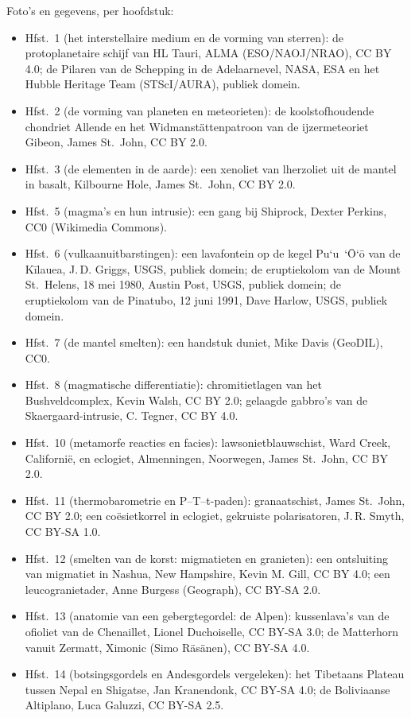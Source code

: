 \bigskip
\noindent Foto's en gegevens, per hoofdstuk:
\begin{itemize}\small
  \item Hfst.~1 (het interstellaire medium en de vorming van sterren): de protoplanetaire schijf van HL Tauri, ALMA (ESO/NAOJ/NRAO), CC BY 4.0; de Pilaren van de Schepping in de Adelaarnevel, NASA, ESA en het Hubble Heritage Team (STScI/AURA), publiek domein.
  \item Hfst.~2 (de vorming van planeten en meteorieten): de koolstofhoudende chondriet Allende en het Widmanstättenpatroon van de ijzermeteoriet Gibeon, James St.~John, CC BY 2.0.
  \item Hfst.~3 (de elementen in de aarde): een xenoliet van lherzoliet uit de mantel in basalt, Kilbourne Hole, James St.~John, CC BY 2.0.
  \item Hfst.~5 (magma's en hun intrusie): een gang bij Shiprock, Dexter Perkins, CC0 (Wikimedia Commons).
  \item Hfst.~6 (vulkaanuitbarstingen): een lavafontein op de kegel Pu`u~`\=O`\=o van de Kīlauea, J.\,D. Griggs, USGS, publiek domein; de eruptiekolom van de Mount St.~Helens, 18 mei 1980, Austin Post, USGS, publiek domein; de eruptiekolom van de Pinatubo, 12 juni 1991, Dave Harlow, USGS, publiek domein.
  \item Hfst.~7 (de mantel smelten): een handstuk duniet, Mike Davis (GeoDIL), CC0.
  \item Hfst.~8 (magmatische differentiatie): chromitietlagen van het Bushveldcomplex, Kevin Walsh, CC BY 2.0; gelaagde gabbro's van de Skaergaard-intrusie, C. Tegner, CC BY 4.0.
  \item Hfst.~10 (metamorfe reacties en facies): lawsonietblauwschist, Ward Creek, Californië, en eclogiet, Almenningen, Noorwegen, James St.~John, CC BY 2.0.
  \item Hfst.~11 (thermobarometrie en P--T--t-paden): granaatschist, James St.~John, CC BY 2.0; een coësietkorrel in eclogiet, gekruiste polarisatoren, J.\,R. Smyth, CC BY-SA 1.0.
  \item Hfst.~12 (smelten van de korst: migmatieten en granieten): een ontsluiting van migmatiet in Nashua, New Hampshire, Kevin M. Gill, CC BY 4.0; een leucogranietader, Anne Burgess (Geograph), CC BY-SA 2.0.
  \item Hfst.~13 (anatomie van een gebergtegordel: de Alpen): kussenlava's van de ofioliet van de Chenaillet, Lionel Duchoiselle, CC BY-SA 3.0; de Matterhorn vanuit Zermatt, Ximonic (Simo Räsänen), CC BY-SA 4.0.
  \item Hfst.~14 (botsingsgordels en Andesgordels vergeleken): het Tibetaans Plateau tussen Nepal en Shigatse, Jan Kranendonk, CC BY-SA 4.0; de Boliviaanse Altiplano, Luca Galuzzi, CC BY-SA 2.5.

\end{itemize}
